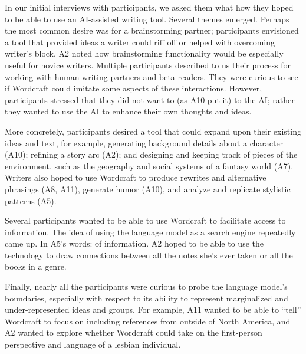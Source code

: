 In our initial interviews with participants, we asked them what how they hoped to be able to use an AI-assisted writing tool. Several themes emerged.
Perhaps the most common desire was for a brainstorming partner; participants envisioned a tool that provided ideas a writer could riff off or helped with overcoming writer's block.
A2 noted how brainstorming functionality would be especially useful for novice writers.
Multiple participants described to us their process for working with human writing partners and beta readers. 
They were curious to see if Wordcraft could imitate some aspects of these interactions.
However, participants stressed that they did not want to  (as A10 put it) to the AI; rather they wanted to use the AI to enhance their own thoughts and ideas.

More concretely, participants desired a tool that could expand upon their existing ideas and text, for example, generating background details about a character (A10);  refining a story arc (A2); and designing and keeping track of pieces of the environment, such as the geography and social systems of a fantasy world (A7).
Writers also hoped to use Wordcraft to produce rewrites and alternative phrasings (A8, A11), generate humor (A10), and analyze and replicate stylistic patterns (A5).

Several participants wanted to be able to use Wordcraft to facilitate access to information.
The idea of using the language model as a search engine repeatedly came up.
In A5's words:  of information.
A2 hoped to be able to use the technology to draw connections between all the notes she's ever taken or all the books in a genre.

Finally, nearly all the participants were curious to probe the language model's boundaries, especially with respect to its ability to represent marginalized and under-represented ideas and groups.
For example, A11 wanted to be able to ``tell'' Wordcraft to focus on including references from outside of North America, and A2 wanted to explore whether Wordcraft could take on the first-person perspective and language of a lesbian individual.


